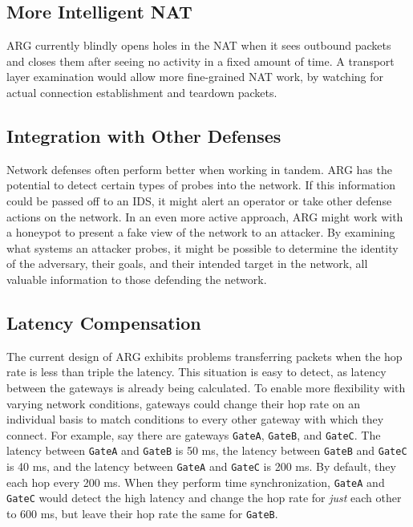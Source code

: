 
\subsection{More Intelligent NAT}
\par \ac{ARG} currently blindly opens holes in the \ac{NAT} when it sees outbound packets and closes them after seeing no activity in a fixed amount of time. A transport layer examination would allow more fine-grained \ac{NAT} work, by watching for actual connection establishment and teardown packets. 

\subsection{Integration with Other Defenses}
\par Network defenses often perform better when working in tandem. \ac{ARG} has the potential to detect certain types of probes into the network. If this information could be passed off to an \ac{IDS}, it might alert an operator or take other defense actions on the network. In an even more active approach, \ac{ARG} might work with a honeypot to present a fake view of the network to an attacker. By examining what systems an attacker probes, it might be possible to determine the identity of the adversary, their goals, and their intended target in the network, all valuable information to those defending the network.

\subsection{Latency Compensation}
\par The current design of \ac{ARG} exhibits problems transferring packets when the hop rate is less than triple the latency. This situation is easy to detect, as latency between the gateways is already being calculated. To enable more flexibility with varying network conditions, gateways could change their hop rate on an individual basis to match conditions to every other gateway with which they connect. For example, say there are gateways \texttt{GateA}, \texttt{GateB}, and \texttt{GateC}. The latency between \texttt{GateA} and \texttt{GateB} is 50 ms, the latency between \texttt{GateB} and \texttt{GateC} is 40 ms, and the latency between \texttt{GateA} and \texttt{GateC} is 200 ms. By default, they each hop every 200 ms. When they perform time synchronization, \texttt{GateA} and \texttt{GateC} would detect the high latency and change the hop rate for \textit{just} each other to 600 ms, but leave their hop rate the same for \texttt{GateB}. 

